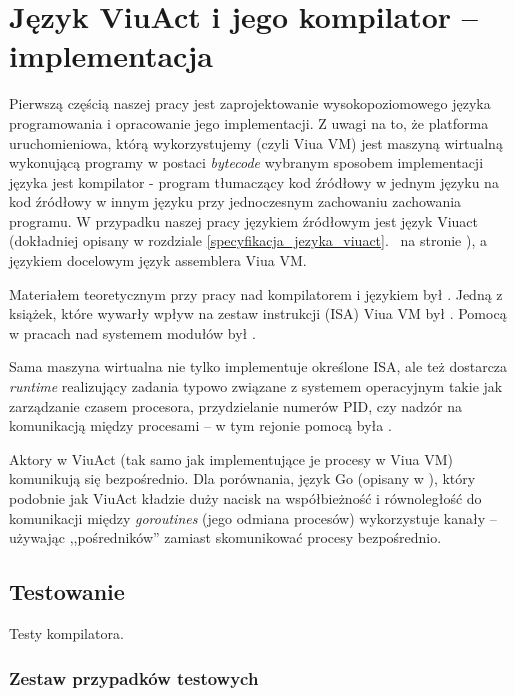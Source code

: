 \chapter{Język ViuAct i jego kompilator -- implementacja}
\label{viuact_impl}
\label{jezyk_viuact_i_jego_kompilator}

Pierwszą częścią naszej pracy jest zaprojektowanie wysokopoziomowego języka programowania i opracowanie jego
implementacji. Z uwagi na to, że platforma uruchomieniowa, którą wykorzystujemy (czyli Viua VM) jest maszyną
wirtualną wykonującą programy w postaci \emph{bytecode} wybranym sposobem implementacji języka jest
kompilator - program tłumaczący kod źródłowy w jednym języku na kod źródłowy w innym języku przy jednoczesnym
zachowaniu zachowania programu. W przypadku naszej pracy językiem źródłowym jest język Viuact (dokładniej
opisany w rozdziale \ref{specyfikacja_jezyka_viuact}.~ na stronie
\pageref{specyfikacja_jezyka_viuact}), a językiem docelowym język assemblera Viua VM.

Materiałem teoretycznym przy pracy nad kompilatorem i językiem był \cite{ProgrammingLanguagePragmatics}.
Jedną z książek, które wywarły wpływ na zestaw instrukcji (ISA) Viua VM był \cite{RISCV}.
Pomocą w pracach nad systemem modułów był \cite{Linkers}.

Sama maszyna wirtualna nie tylko implementuje określone ISA, ale też dostarcza \emph{runtime} realizujący
zadania typowo związane z systemem operacyjnym takie jak zarządzanie czasem procesora, przydzielanie numerów
PID, czy nadzór na komunikacją między procesami -- w tym rejonie pomocą była \cite{OperatingSystems}.

Aktory w ViuAct (tak samo jak implementujące je procesy w Viua VM) komunikują się bezpośrednio.
Dla porównania, język Go (opisany w \cite{Golang}), który podobnie jak ViuAct kładzie duży nacisk na
współbieżność i równoległość do komunikacji między \emph{goroutines} (jego odmiana procesów) wykorzystuje
kanały -- używając ,,pośredników'' zamiast skomunikować procesy bezpośrednio.





\section{Testowanie}

Testy kompilatora.

\subsection{Zestaw przypadków testowych}

